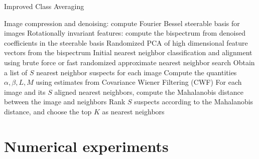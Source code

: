 \documentclass{article}
\begin{document}
\begin{algorithm}
\caption{Improved Class Averaging }
\label{alg:classav}
\begin{algorithmic}[1]
\State Image compression and denoising: compute Fourier Bessel steerable basis for images \cite{ffbspca}
\State Rotationally invariant features: compute the bispectrum from denoised coefficients in the steerable basis
\State Randomized PCA\cite{rokhlin} of high dimensional feature vectors from the bispectrum
\State Initial nearest neighbor classification and alignment using brute force or fast randomized approximate nearest neighbor search \cite{fastnn}
\State Obtain a list of $S$ nearest neighbor suspects for each image
\EndProcedure
{}
\State Compute the quantities $\alpha, \beta, L, M$ using estimates from Covariance Wiener Filtering (CWF) \cite{cwf}
\State For each image and its $S$ aligned nearest neighbors, compute the Mahalanobis distance between the image and neighbors
\State Rank $S$ suspects according to the Mahalanobis distance, and choose the top $K$ as nearest neighbors
\EndProcedure
{}
\EndProcedure
\end{algorithmic}
\end{algorithm}


\section{Numerical experiments}
\end{document}
